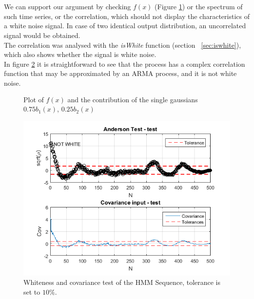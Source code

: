 \documentclass[10pt,a4paper,final]{article}
\begin{document}
\\ \\
We can support our argument by checking  $f(x)$ (Figure \ref{fig:f}) or the spectrum of such time series, or the correlation, which should not display the characteristics of a white noise signal. In case of two identical output distribution, an uncorrelated signal would be obtained. \\
The correlation was analysed with the \textit{isWhite} function (section ~\ref{sec:iswhite}), which also shows whether the signal is white noise.\\In figure \ref{fig:A2} it is straightforward to see that the process has a complex correlation function that may be approximated by an ARMA process, and it is not white noise.
\begin{figure}[h]
\centering
{}
 \caption{Plot of $f(x)$ and the contribution of the single gaussians $0.75b_1(x)$, $0.25b_2(x)$}	
 \label{fig:f}
\end{figure}
\begin{figure}[h]
		\centering
		\includegraphics[width=0.55\linewidth]{./images/A2.png}
		\caption{Whiteness and covariance test of the HMM Sequence, tolerance is set to $10\%$.}
		\label{fig:A2}	
\end{figure}

\newpage
\end{document}
